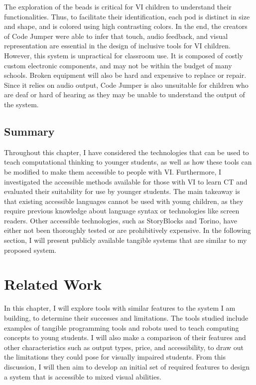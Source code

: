\documentclass[oneside,%
                    author={Malak Hajji},
                    degree={BSc},
                    title={Designing An Accessible Computational Toolkit For Students},
                  subtitle={With Mixed Visual Abilities}]{dissertation}
\begin{document}
The exploration of the beads is  critical for VI children to understand their functionalities. Thus, to facilitate their identification, each pod is distinct in size and shape, and is colored using high contrasting colors. In the end, the creators of Code Jumper were able to infer that touch, audio feedback, and visual representation are essential in the design of inclusive tools for VI children.
However, this system is unpractical for classroom use. It is composed of costly custom electronic components, and may not be within the budget of many schools. Broken equipment will also be hard and expensive to replace or repair. Since it relies on audio output, Code Jumper is also unsuitable for children who are deaf or hard of hearing as they may be unable to understand the output of the system.

\section{Summary}
Throughout this chapter, I have considered the technologies that can be used to teach computational thinking to younger students, as well as how these tools can be modified to make them accessible to people with VI. Furthermore, I investigated the accessible methods available for those with VI to learn CT and evaluated their suitability for use by younger students. The main takeaway is that existing accessible languages cannot be used with young children, as they require previous knowledge about language syntax or technologies like screen readers. Other accessible technologies, such as StoryBlocks and Torino, have either not been thoroughly tested or are prohibitively expensive. In the following section, I will present publicly available tangible systems that are similar to my proposed system. 

\chapter{Related Work}
\label{chap:related}
In this chapter, I will explore tools with similar features to the system I am building, to determine their successes and limitations. The tools studied include examples of tangible programming tools and robots used to teach computing concepts to young students. I will also make a comparison of their features and other characteristics such as output types, price, and accessibility, to draw out the limitations they could pose for visually impaired students. From this discussion, I will then aim to develop an initial set of required features to design a system that is accessible to mixed visual abilities.
\end{document}
